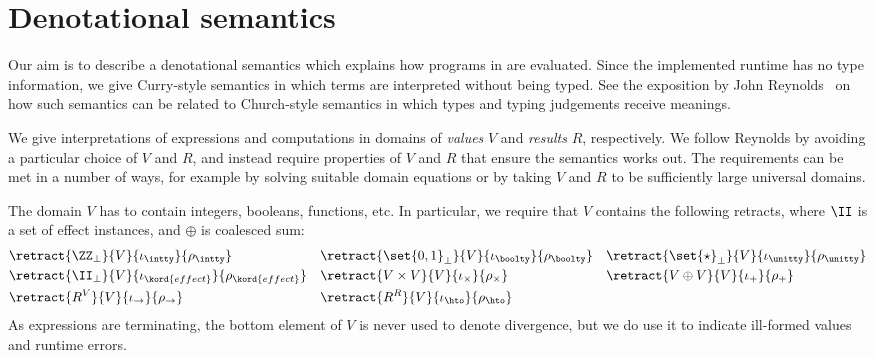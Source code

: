\section{Denotational semantics}
\label{sec:semantics}

Our aim is to describe a denotational semantics which explains how programs in \eff are evaluated.
%
Since the implemented runtime has no type information, we give Curry-style semantics
in which terms are interpreted without being typed.
%
See the exposition by John Reynolds~\cite{reynolds00themeaning} on how such semantics can
be related to Church-style semantics in which types and typing judgements receive meanings.

We give interpretations of expressions and computations in domains of \emph{values} $V$
and \emph{results} $R$, respectively. We follow Reynolds by avoiding a particular choice
of $V$ and $R$, and instead require properties of $V$ and $R$ that ensure the semantics
works out. The requirements can be met in a number of ways, for example by solving
suitable domain equations or by taking $V$ and $R$ to be sufficiently large universal
domains.

The domain $V$ has to contain integers, booleans, functions, etc.
In particular, we require that $V$ contains the following retracts, where $\II$ is a 
set of effect instances, and $\oplus$ is coalesced sum:
%
\begin{align*}
  &\retract{\ZZ_\bot}{V}{\iota_{\intty}}{\rho_{\intty}}
  &
  &\retract{\set{0, 1}_\bot}{V}{\iota_{\boolty}}{\rho_{\boolty}}
  &
  &\retract{\set{\star}_\bot}{V}{\iota_{\unitty}}{\rho_{\unitty}}
  \\
  &\retract{\II_\bot}{V}{\iota_{\kord{effect}}}{\rho_{\kord{effect}}}
  &
  &\retract{V \times V}{V}{\iota_{\times}}{\rho_{\times}}
  &
  &\retract{V \oplus V}{V}{\iota_{+}}{\rho_{+}}
  \\
  &\retract{R^V}{V}{\iota_{\to}}{\rho_{\to}}
  &
  &\retract{R^R}{V}{\iota_{\hto}}{\rho_{\hto}}
\end{align*}
%
As expressions are terminating, the bottom element of $V$ is never used to denote
divergence, but we do use it to indicate ill-formed values and runtime errors.

\newcommand{\operationDomain}{\II \times \OO \times V \times R^V}

